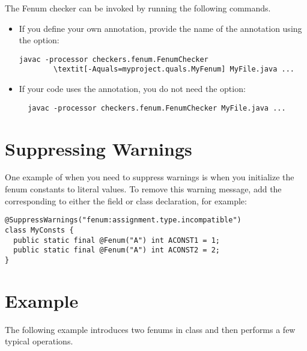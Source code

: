 The Fenum checker can be invoked by running the following commands.

\begin{itemize}
  \item 
If you define your own annotation, provide the name of the annotation using the
 option:

\begin{Verbatim}[commandchars=\\\[\]]
  javac -processor checkers.fenum.FenumChecker
        \textit[-Aquals=myproject.quals.MyFenum] MyFile.java ...
\end{Verbatim}


\item
If your code uses the  annotation, you do
not need the  option:

\begin{Verbatim}
  javac -processor checkers.fenum.FenumChecker MyFile.java ...
\end{Verbatim}

\end{itemize}



\section{Suppressing Warnings}

One example of when you need to suppress warnings is when you initialize the
fenum constants to literal values.
To remove this warning message, add the corresponding  to either
the field or class declaration, for example:

\begin{Verbatim}
@SuppressWarnings("fenum:assignment.type.incompatible")
class MyConsts {
  public static final @Fenum("A") int ACONST1 = 1;
  public static final @Fenum("A") int ACONST2 = 2;  
}
\end{Verbatim}



\section{Example}

The following example introduces two fenums in class 
and then performs a few typical operations.

